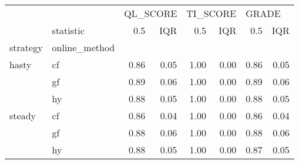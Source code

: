 \begin{tabular}{llrrrrrr}
\toprule
       & {} & \multicolumn{2}{l}{QL\_SCORE} & \multicolumn{2}{l}{TI\_SCORE} & \multicolumn{2}{l}{GRADE} \\
       & statistic &      0.5 &  IQR &      0.5 &  IQR &   0.5 &  IQR \\
strategy & online\_method &          &      &          &      &       &      \\
\midrule
hasty & cf &     0.86 & 0.05 &     1.00 & 0.00 &  0.86 & 0.05 \\
       & gf &     0.89 & 0.06 &     1.00 & 0.00 &  0.89 & 0.06 \\
       & hy &     0.88 & 0.05 &     1.00 & 0.00 &  0.88 & 0.05 \\
steady & cf &     0.86 & 0.04 &     1.00 & 0.00 &  0.86 & 0.04 \\
       & gf &     0.88 & 0.06 &     1.00 & 0.00 &  0.88 & 0.06 \\
       & hy &     0.88 & 0.05 &     1.00 & 0.00 &  0.87 & 0.05 \\
\bottomrule
\end{tabular}

